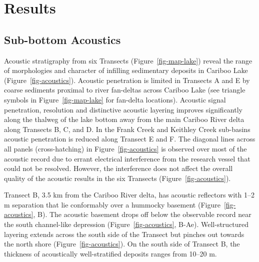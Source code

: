 \documentclass[
  letterpaper,
  DIV=11,
  numbers=noendperiod]{scrartcl}
\begin{document}
\section{Results}\label{results}

\subsection{Sub-bottom Acoustics}\label{sub-bottom-acoustics}

Acoustic stratigraphy from six Transects (Figure~\ref{fig-map-lake})
reveal the range of morphologies and character of infilling sedimentary
deposits in Cariboo Lake (Figure~\ref{fig-acoustics}). Acoustic
penetration is limited in Transects A and E by coarse sediments proximal
to river fan-deltas across Cariboo Lake (see triangle symbols in
Figure~\ref{fig-map-lake} for fan-delta locations). Acoustic signal
penetration, resolution and distinctive acoustic layering improves
significantly along the thalweg of the lake bottom away from the main
Cariboo River delta along Transects B, C, and D. In the Frank Creek and
Keithley Creek sub-basins acoustic penetration is reduced along Transect
E and F. The diagonal lines across all panels (cross-hatching) in
Figure~\ref{fig-acoustics} is observed over most of the acoustic record
due to errant electrical interference from the research vessel that
could not be resolved. However, the interference does not affect the
overall quality of the acoustic results in the six Transects
(Figure~\ref{fig-acoustics}).

Transect B, 3.5 km from the Cariboo River delta, has acoustic reflectors
with 1--2 m separation that lie conformably over a hummocky basement
(Figure~\ref{fig-acoustics}, B). The acoustic basement drops off below
the observable record near the south channel-like depression
(Figure~\ref{fig-acoustics}, B-Ae). Well-structured layering extends
across the south side of the Transect but pinches out towards the north
shore (Figure~\ref{fig-acoustics}). On the south side of Transect B, the
thickness of acoustically well-stratified deposits ranges from 10--20 m.
\end{document}
